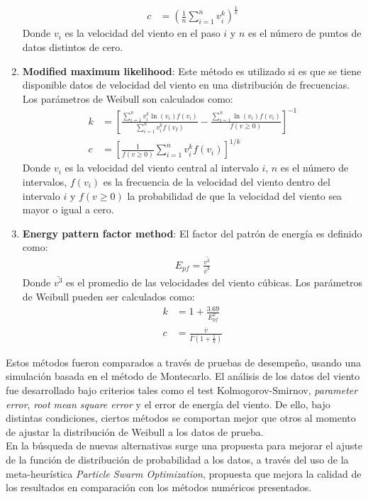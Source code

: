 \begin{enumerate}
\begin{align}
            c &= (\frac{1}{n}\sum_{i=1}^n v_i^k)^{\frac{1}{k}}
        \end{align}    
         Donde $v_i$ es la velocidad del viento en el paso $i$ y $n$ es el número de puntos de datos distintos de cero. 
    \item \textbf{Modified maximum likelihood}: Este método es utilizado si es que se tiene disponible datos de velocidad del viento en una distribución de frecuencias. Los parámetros de Weibull son calculados como:
        \begin{align}
            k &= [\frac{\sum_{i=1}^n v_i^k \ln(v_i)f(v_i)}{\sum_{i=1}^n v_i^kf(v_I)} - \frac{\sum_{i=1}^n\ln(v_i)f(v_i)}{f(v \geq 0)}]^{-1}\\
            c &= [\frac{1}{f(v \geq 0)}\sum_{i=1}^n v_i^{k}f(v_i)]^{1/k}
        \end{align}
         Donde $v_i$ es la velocidad del viento central al intervalo $i$, $n$ es el número de intervalos, $f(v_i)$ es la frecuencia de la velocidad del viento dentro del intervalo $i$ y $f(v \geq 0)$ la probabilidad de que la velocidad del viento sea mayor o igual a cero.
    \item \textbf{Energy pattern factor method}: El factor del patrón de energía es definido como:
        \begin{align}
            E_{pf} = \frac{\bar{v^3}}{\bar{v}^3}
        \end{align}   
         Donde $\bar{v^3}$ es el promedio de las velocidades del viento cúbicas. Los parámetros de Weibull pueden ser calculados como:
        \begin{align}
            k &= 1 + \frac{3.69}{E_{pf}^2}\\
            c &= \frac{\bar{v}}{\Gamma(1 + \frac{1}{k})}
        \end{align}    
 \end{enumerate}     
 Estos métodos fueron comparados a través de pruebas de desempeño, usando una simulación basada en el método de Montecarlo. El análisis de los datos del viento fue desarrollado bajo criterios tales como el test Kolmogorov-Smirnov, \emph{parameter error}, \emph{root mean square error} y el error de energía del viento. De ello, bajo distintas condiciones, ciertos métodos se comportan mejor que otros al momento de ajustar la distribución de Weibull a los datos de prueba. \\
 En la búsqueda de nuevas alternativas surge una propuesta para mejorar el ajuste de la función de distribución de probabilidad a los datos, a través del uso de la meta-heurística \emph{Particle Swarm Optimization}, propuesta que mejora la calidad de los resultados en comparación con los métodos numéricos presentados.  
